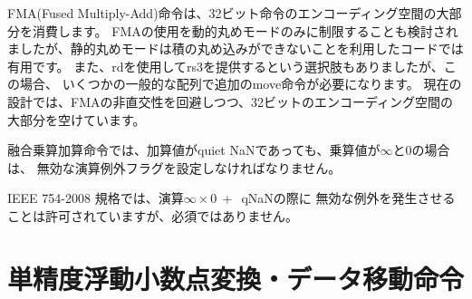 {\begin{commentary}
FMA(Fused Multiply-Add)命令は、32ビット命令のエンコーディング空間の大部分を消費します。
FMAの使用を動的丸めモードのみに制限することも検討されましたが、静的丸めモードは積の丸め込みができないことを利用したコードでは有用です。
また、rdを使用してrs3を提供するという選択肢もありましたが、この場合、
いくつかの一般的な配列で追加のmove命令が必要になります。
現在の設計では、FMAの非直交性を回避しつつ、32ビットのエンコーディング空間の大部分を空けています。
\end{commentary}

\begin{comment}
The fused multiply-add instructions must set the invalid operation exception flag
when the multiplicands are $\infty$ and zero, even when the addend is a quiet
NaN.
\end{comment}

融合乗算加算命令では、加算値がquiet NaNであっても、乗算値が$\infty$と0の場合は、
無効な演算例外フラグを設定しなければなりません。

\begin{commentary}
\begin{comment}
The IEEE 754-2008 standard permits, but does not require, raising the
invalid exception for the operation \mbox{$\infty\times 0\ +$ qNaN}.
\end{comment}

IEEE 754-2008 規格では、演算\mbox{$\infty\times 0\ +$ qNaN}の際に
無効な例外を発生させることは許可されていますが、必須ではありません。
\end{commentary}

\begin{comment}
\section{Single-Precision Floating-Point Conversion and Move \mbox{Instructions}}
\end{comment}
\section{単精度浮動小数点変換・データ移動\mbox{命令}}

\begin{comment}
Floating-point-to-integer and integer-to-floating-point conversion
instructions are encoded in the OP-FP major opcode space.
FCVT.W.S or FCVT.L.S converts a floating-point number
in floating-point register {\em rs1} to a signed 32-bit or 64-bit
integer, respectively, in integer register {\em rd}.  FCVT.S.W
or FCVT.S.L converts a 32-bit or 64-bit signed integer,
respectively, in integer register {\em rs1} into a floating-point
number in floating-point register {\em rd}. FCVT.WU.S,
FCVT.LU.S, FCVT.S.WU, and FCVT.S.LU variants
convert to or from unsigned integer values.
For XLEN$>32$, FCVT.W[U].S sign-extends the 32-bit result to the
destination register width.
FCVT.L[U].S and FCVT.S.L[U] are RV64-only instructions.
If the rounded result is not representable in the destination format,
it is clipped to the nearest value and the invalid flag is set.
Table~\ref{tab:int_conv} gives the range of valid inputs for FCVT.{\em int}.S
and the behavior for invalid inputs.
\end{comment}

}

